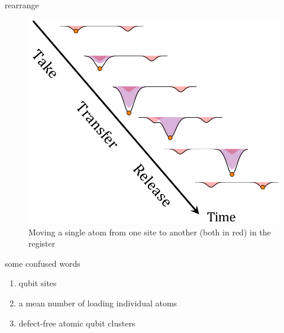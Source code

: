 \documentclass[18 pt]{beamer}
\begin{document}
\begin{frame}{rearrange}
  \begin{figure}
    \includegraphics[width=.5\textwidth]{IMG/rearrange.png}
    \caption{Moving a single atom from one site to another (both in red) in the register}
  \end{figure}
\end{frame}
\begin{frame}{some confused words}
  \begin{enumerate}
    \item qubit sites
    \item a mean number of loading individual atoms
    \item defect-free atomic qubit clusters
  \end{enumerate}
\end{frame}

\end{document}
